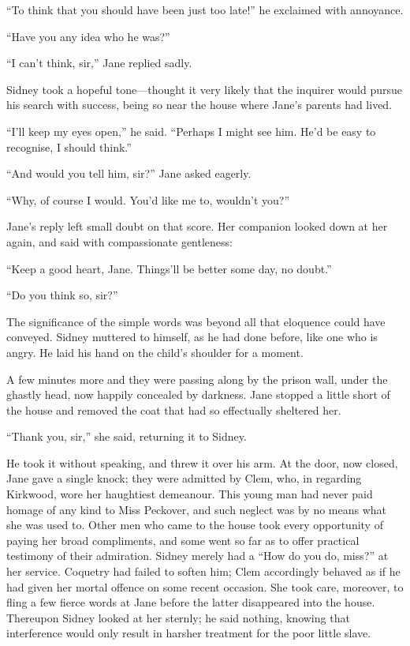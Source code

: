 ``To think that you should have been just too late!'' he exclaimed with
annoyance.

``Have you any idea who he was?''

``I can't think, sir,'' Jane replied sadly.

{\protect\hypertarget{33}{}{}}Sidney took a hopeful tone---thought it
very likely that the inquirer would pursue his search with success,
being so near the house where Jane's parents had lived.

``I'll keep my eyes open,'' he said. ``Perhaps I might see him. He'd be
easy to recognise, I should think.''

``And would you tell him, sir?'' Jane asked eagerly.

``Why, of course I would. You'd like me to, wouldn't you?''

Jane's reply left small doubt on that score. Her companion looked down
at her again, and said with compassionate gentleness:

``Keep a good heart, Jane. Things'll be better some day, no doubt.''

``Do you think so, sir?''

The significance of the simple words was beyond all that eloquence could
have conveyed. Sidney muttered to himself, as he had done before, like
one who is angry. He laid his hand on the child's shoulder for a moment.

A few minutes more and they were passing
{\protect\hypertarget{34}{}{}}along by the prison wall, under the
ghastly head, now happily concealed by darkness. Jane stopped a little
short of the house and removed the coat that had so effectually
sheltered her.

``Thank you, sir,'' she said, returning it to Sidney.

He took it without speaking, and threw it over his arm. At the door, now
closed, Jane gave a single knock; they were admitted by Clem, who, in
regarding Kirkwood, wore her haughtiest demeanour. This young man had
never paid homage of any kind to Miss Peckover, and such neglect was by
no means what she was used to. Other men who came to the house took
every opportunity of paying her broad compliments, and some went so far
as to offer practical testimony of their admiration. Sidney merely had a
``How do you do, miss?'' at her service. Coquetry had failed to soften
him; Clem accordingly behaved as if he had given her mortal offence on
some recent occasion. She took care, moreover, to fling a few fierce
words at Jane {\protect\hypertarget{35}{}{}}before the latter
disappeared into the house. Thereupon Sidney looked at her sternly; he
said nothing, knowing that interference would only result in harsher
treatment for the poor little slave.


